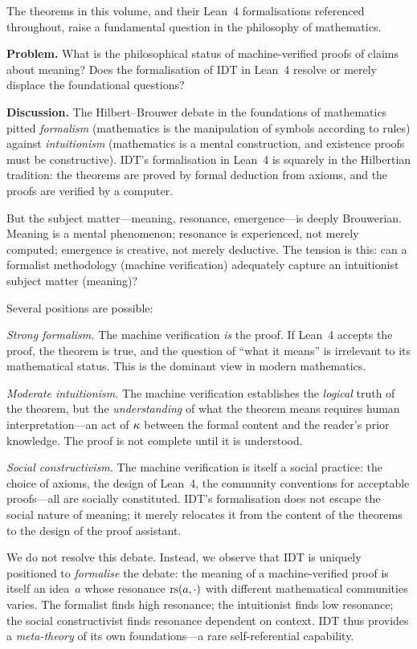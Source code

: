 The theorems in this volume, and their Lean~4 formalisations referenced
throughout, raise a fundamental question in the philosophy of
mathematics.

\begin{game}
\label{op:brouwer-hilbert}
\textbf{Problem.}  What is the philosophical status of machine-verified
proofs of claims about meaning?  Does the formalisation of IDT in
Lean~4 resolve or merely displace the foundational questions?

\textbf{Discussion.}  The Hilbert--Brouwer debate in the foundations of
mathematics pitted \emph{formalism} (mathematics is the manipulation of
symbols according to rules) against \emph{intuitionism} (mathematics is
a mental construction, and existence proofs must be constructive).  IDT's
formalisation in Lean~4 is squarely in the Hilbertian tradition: the
theorems are proved by formal deduction from axioms, and the proofs are
verified by a computer.

But the subject matter---meaning, resonance, emergence---is deeply
Brouwerian.  Meaning is a mental phenomenon; resonance is experienced,
not merely computed; emergence is creative, not merely deductive.  The
tension is this: can a formalist methodology (machine verification)
adequately capture an intuitionist subject matter (meaning)?

Several positions are possible:

\emph{Strong formalism.}  The machine verification \emph{is} the proof.
If Lean~4 accepts the proof, the theorem is true, and the question of
``what it means'' is irrelevant to its mathematical status.  This is the
dominant view in modern mathematics.

\emph{Moderate intuitionism.}  The machine verification establishes the
\emph{logical} truth of the theorem, but the \emph{understanding} of
what the theorem means requires human interpretation---an act of
$\kappa$ between the formal content and the reader's prior knowledge.
The proof is not complete until it is understood.

\emph{Social constructivism.}  The machine verification is itself a
social practice: the choice of axioms, the design of Lean~4, the
community conventions for acceptable proofs---all are socially
constituted.  IDT's formalisation does not escape the social nature
of meaning; it merely relocates it from the content of the theorems
to the design of the proof assistant.

We do not resolve this debate.  Instead, we observe that IDT is
uniquely positioned to \emph{formalise} the debate: the meaning of a
machine-verified proof is itself an idea~$a$ whose resonance
$\mathrm{rs}(a, \cdot)$ with different mathematical communities varies.
The formalist finds high resonance; the intuitionist finds low
resonance; the social constructivist finds resonance dependent on
context.  IDT thus provides a \emph{meta-theory} of its own
foundations---a rare self-referential capability.
\end{game}


